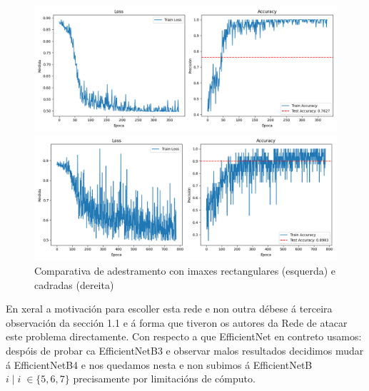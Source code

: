\documentclass{article}
\begin{document}
\begin{itemize}
\begin{figure}[h]
	\centering
	\begin{minipage}{0.45\textwidth}
		\centering
		\includegraphics[width=\linewidth]{rectangulo.png}
	\end{minipage}
	\hfill
	\begin{minipage}{0.45\textwidth}
		\centering
		\includegraphics[width=\linewidth]{cadrado.png}
	\end{minipage}
	\label{fig:comparativa}
	\caption{Comparativa de adestramento con imaxes rectangulares (esquerda) e cadradas (dereita)}
\end{figure}






En xeral a motivación para escoller esta rede e non outra débese á terceira observación da sección 1.1 e á forma que tiveron os autores da Rede de atacar este problema directamente. Con respecto a que EfficientNet en contreto usamos: despóis de probar ca EfficientNetB3 e observar malos resultados decidimos mudar á EfficientNetB4 e nos quedamos nesta e non subimos á EfficientNetB$i \; |\; i\; \in \{5,6,7\}$ precisamente por limitacións de cómputo.


\end{itemize}
\end{document}
